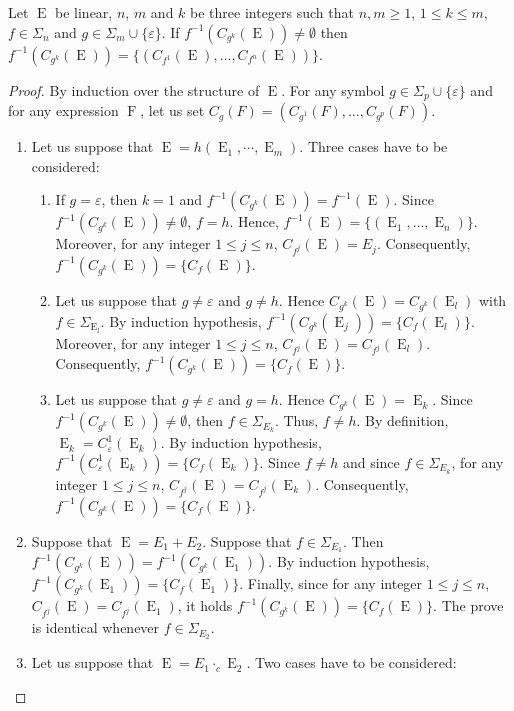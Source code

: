 \documentclass{llncs}
\DeclareMathOperator{\E}{E}
\DeclareMathOperator{\f}{F}
\begin{document}
\begin{lemma}\label{lem f cgk cf}
Let $\E$ be linear,  $n$, $m$ and $k$ be three integers such that $n,m\geq 1$, $1\leq k\leq m$, $f\in\Sigma_n$ and  $g\in\Sigma_m\cup\{\varepsilon\}$. If $f^{-1}(C_{g^k}(\E))\neq \emptyset$ then $f^{-1}(C_{g^k}(\E))=\{(C_{f^1}(\E),\dots,C_{f^n}(\E))\}$.
\end{lemma}
\begin{proof}
  By induction over the structure of $\E$. For any symbol $g\in\Sigma_p\cup\{\varepsilon\}$ and for any expression $\f$, let us set 
  $C_g(F)=(C_{g^1}(F),\dots,C_{g^p}(F))$.
  \begin{enumerate}
    \item Let us suppose that $\E=h(\E_1, \cdots,\E_m)$. Three cases have to be considered:
    \begin{enumerate}
      \item If $g=\varepsilon$, then $k=1$ and $f^{-1}(C_{g^k}(\E))=f^{-1}(\E)$. Since $f^{-1}(C_{g^k}(\E))\neq \emptyset$, $f=h$. Hence, $f^{-1}(\E)=\{(\E_1,\ldots,\E_n)\}$. Moreover, for any integer $1\leq j\leq n$, $C_{f^j}(\E)=E_j$. Consequently, $f^{-1}(C_{g^k}(\E))=\{C_{f}(\E)\}$.
      \item Let us suppose that $g\neq\varepsilon$ and $g\neq h$. Hence $C_{g^k}(\E)=C_{g^k}(\E_l)$ with $f\in \Sigma_{\E_l}$. By induction hypothesis, $f^{-1}(C_{g^k}(\E_j))=\{C_{f}(\E_l)\}$. Moreover, for any integer $1\leq j\leq n$, $C_{f^j}(\E)=C_{f^j}(\E_l)$. Consequently, $f^{-1}(C_{g^k}(\E))=\{C_{f}(\E)\}$.
      \item Let us suppose that $g\neq\varepsilon$ and $g=h$. Hence $C_{g^k}(\E)=\E_k$. Since $f^{-1}(C_{g^k}(\E))\neq \emptyset$, then $f\in\Sigma_{E_k}$. Thus, $f\neq h$. By definition, $\E_k=C_\varepsilon^1(\E_k)$. By induction hypothesis, $f^{-1}(C_\varepsilon^1(\E_k))=\{C_{f}(\E_k)\}$. Since $f\neq h$ and since $f\in\Sigma_{E_k}$, for any integer $1\leq j\leq n$, $C_{f^j}(\E)=C_{f^j}(\E_k)$. Consequently, $f^{-1}(C_{g^k}(\E))=\{C_{f}(\E)\}$.
    \end{enumerate}
    \item Suppose that $\E=E_1+E_2$. Suppose that $f\in\Sigma_{E_1}$. Then $f^{-1}(C_{g^k}(\E))=f^{-1}(C_{g^k}(\E_1))$. By induction hypothesis, $f^{-1}(C_{g^k}(\E_1))=\{C_{f}(\E_1)\}$. Finally, since for any integer $1\leq j\leq n$, $C_{f^j}(\E)=C_{f^j}(\E_1)$, it holds $f^{-1}(C_{g^k}(\E))=\{C_{f}(\E)\}$. The prove is identical whenever $f\in\Sigma_{E_2}$.
    \item Let us suppose that $\E=E_1\cdot_c \E_2$. Two cases have to be considered:

\end{enumerate}
\end{proof}
\end{document}
